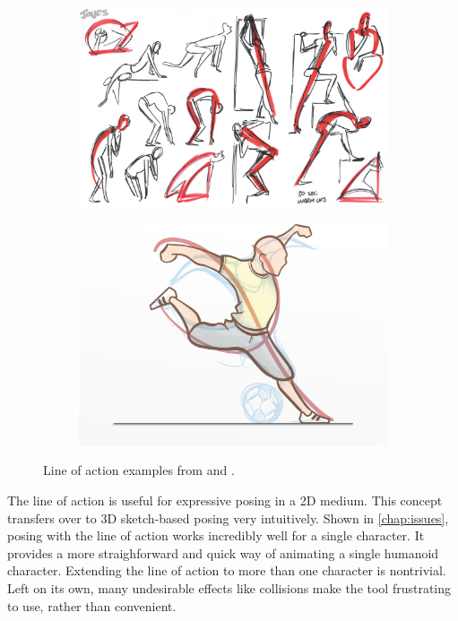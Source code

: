 \begin{figure}[h!]
	\centering
        \begin{subfigure}[b!]{0.45\textwidth}
        	\centering
                \includegraphics[width=\linewidth]{img/cartoon}
                \label{fig:gesture}
        \end{subfigure}
        \quad
        \begin{subfigure}[b!]{0.45\textwidth}
        	\centering
                \includegraphics[width=\linewidth]{img/kick}
                \label{fig:kick}
        \end{subfigure}%
        \caption{Line of action examples from \protect{} and \protect{}.}
	\label{fig:lines}
\end{figure}

The line of action is useful for expressive posing in a 2D medium. This concept transfers over to 3D sketch-based posing very intuitively. Shown in \autoref{chap:issues}, posing with the line of action works incredibly well for a single character. It provides a more straighforward and quick way of animating a single humanoid character. Extending the line of action to more than one character is nontrivial. Left on its own, many undesirable effects like collisions make the tool frustrating to use, rather than convenient. 

